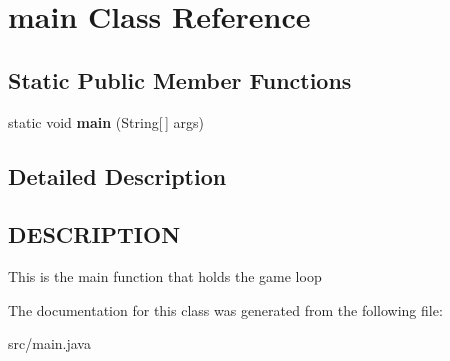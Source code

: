 \hypertarget{classmain}{\section{main Class Reference}
\label{classmain}
}
\subsection*{Static Public Member Functions}
\begin{DoxyCompactItemize}
\item 
\hypertarget{classmain_a0877f3b412d48b8c92fa25c4b98c2f5a}{static void {\bfseries main} (String\mbox{[}$\,$\mbox{]} args)}\label{classmain_a0877f3b412d48b8c92fa25c4b98c2f5a}

\end{DoxyCompactItemize}


\subsection{Detailed Description}
\hypertarget{classvalidMoveTest_DESCRIPTION}{}\subsection{D\-E\-S\-C\-R\-I\-P\-T\-I\-O\-N}\label{classvalidMoveTest_DESCRIPTION}
This is the main function that holds the game loop 

The documentation for this class was generated from the following file\-:\begin{DoxyCompactItemize}
\item 
src/main.\-java\end{DoxyCompactItemize}
